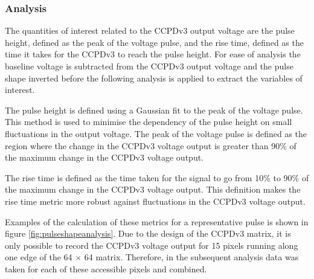 
\subsubsection{Analysis}
The quantities of interest related to the CCPDv3 output voltage are the pulse height, defined as the peak of the voltage pulse, and the rise time, defined as the time it takes for the CCPDv3 to reach the pulse height.  For ease of analysis the baseline voltage is subtracted from the CCPDv3 output voltage and the pulse shape inverted before the following analysis is applied to extract the variables of interest.  

The pulse height is defined using a Gaussian fit to the peak of the voltage pulse.  This method is used to minimise the dependency of the pulse height on small fluctuations in the output voltage.  The peak of the voltage pulse is defined as the region where the change in the CCPDv3 voltage output is greater than 90\% of the maximum change in the CCPDv3 voltage output.  

The rise time is defined as the time taken for the signal to go from 10\% to 90\% of the maximum change in the CCPDv3 voltage output.  This definition makes the rise time metric more robust against fluctuations in the CCPDv3 voltage output.  

Examples of the calculation of these metrics for a representative pulse is shown in figure \ref{fig:pulseshapeanalysis}.  Due to the design of the CCPDv3 matrix, it is only possible to record the CCPDv3 voltage output for 15 pixels running along one edge of the 64 $\times$ 64 matrix.  Therefore, in the subsequent analysis data was taken for each of these accessible pixels and combined.

